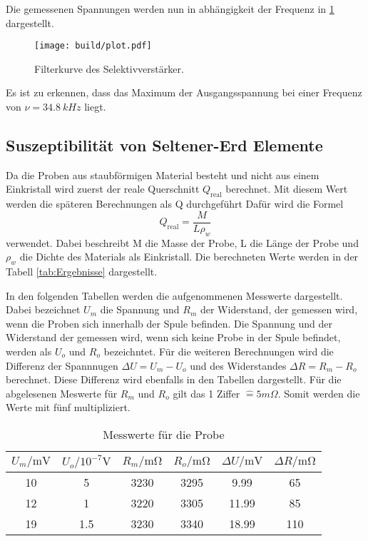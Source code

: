 \noindent Die gemessenen Spannungen werden nun in abhängigkeit der Frequenz in  \ref{fig:filter} dargestellt.

\begin{figure}[H]
    \centering
    \texttt{[image: build/plot.pdf]}
    \caption{Filterkurve des Selektivverstärker.}
    \label{fig:filter}
\end{figure} 

\noindent Es ist zu erkennen, dass das Maximum der Ausgangsspannung bei einer Frequenz von $\nu = \qty{34.8}{kHz}$ liegt.

\subsection{Suszeptibilität von Seltener-Erd Elemente}

Da die Proben aus staubförmigen Material besteht und nicht aus einem Einkristall wird zuerst der reale Querschnitt $Q_\text{real}$ berechnet.
Mit diesem Wert werden die späteren Berechnungen als Q durchgeführt
Dafür wird die Formel 
\begin{equation}
    Q_\text{real} = \frac{M}{L \rho_w}
\end{equation}
verwendet.
Dabei beschreibt M die Masse der Probe, L die Länge der Probe und $\rho_w$ die Dichte des Materials als Einkristall.
Die berechneten Werte werden in der Tabell \ref{tab:Ergebnisse} dargestellt.

\noindent In den folgenden Tabellen werden die aufgenommenen Messwerte dargestellt. Dabei bezeichnet $U_m$ die Spannung und $R_m$ der Widerstand, der gemessen wird, wenn die Proben sich
innerhalb der Spule befinden. 
Die Spannung und der Widerstand der gemessen wird, wenn sich keine Probe in der Spule befindet, werden als $U_o$ und $R_o$ bezeichntet.
Für die weiteren Berechnungen wird die Differenz der Spannnugen $\Delta U = U_m -U_o$ und des Widerstandes $\Delta R = R_m - R_o$ berechnet.
Diese Differenz wird ebenfalls in den Tabellen dargestellt.
Für die abgelesenen Meswerte für $R_m$ und $R_o$ gilt das 1 Ziffer $\widehat{=} 5 m \Omega$. 
Somit werden die Werte mit fünf multipliziert.

\begin{table}[H]
    \centering
    \caption{Messwerte für die Probe }
    \label{tab:Nd}
    \begin{tabular}{c c c c c c}
        \toprule
        $U_m / \unit{\milli\volt}$ & $U_o / 10^{-7}\unit{\volt}$ & $R_m /\unit{\milli\ohm}$ & $R_o /\unit{\milli\ohm}$ & $\Delta U /\unit{\milli\volt}$ & $\Delta R /\unit{\milli\ohm}$ \\
        \midrule        
        10  & 5    & 3230  & 3295  & 9.99  &   65   \\ 
        12  & 1    & 3220  & 3305  & 11.99  &  85    \\ 
        19  & 1.5  & 3230  & 3340  & 18.99  &  110    \\ 
        \bottomrule
    \end{tabular}
\end{table}

